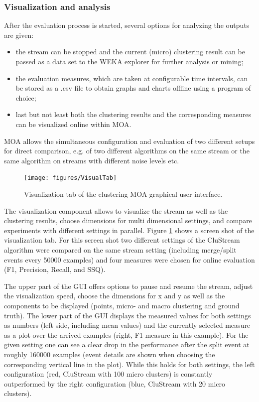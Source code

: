 \documentclass[a4paper,12pt,twoside]{book}
\begin{document}
\subsubsection{Visualization and analysis}
\label{sec:gui}

After the evaluation process is started, several options for analyzing the outputs are given:
\begin{itemize}
\item the stream can be stopped and the current (micro) clustering result can be passed as a data set to the WEKA explorer for further analysis or mining; 
\item the evaluation measures, which are taken at configurable time intervals, can be stored as a {.csv} file to obtain graphs and charts offline using a program of choice;
\item last but not least both the clustering results and the corresponding measures can be visualized online within MOA.\end{itemize}


MOA allows the simultaneous configuration and evaluation of two different setups for direct comparison, e.g. of two different algorithms 
on the same stream or the same algorithm on streams with different noise levels etc.

\begin{figure}[t]
\begin{center} 
\texttt{[image: figures/VisualTab]}
\end{center} 
\caption{Visualization tab of the clustering MOA graphical user interface.}
\label{fig:VisualTab}
\end{figure}

The visualization component allows to visualize the stream as well as the clustering results, choose dimensions for multi dimensional settings, and compare experiments with different settings in parallel. 
Figure \ref{fig:VisualTab} shows a screen shot of the visualization tab. 
For this screen shot two different settings of the CluStream algorithm were compared on the same stream setting (including merge/split events every 50000 examples) 
and four measures were chosen for online evaluation (F1, Precision, Recall, and SSQ). 

The upper part of the GUI offers options to pause and resume the stream, adjust the visualization speed, choose the dimensions for x and y as well as the components to be displayed 
(points, micro- and macro clustering and ground truth). The lower part of the GUI displays the measured values for both settings as numbers 
(left side, including mean values) and the currently selected measure as a plot over the arrived examples (right, F1 measure in this example).
 For the given setting one can see a clear drop in the performance after the split event at roughly 160000 examples 
(event details are shown when choosing the corresponding vertical line in the plot). 
While this holds for both settings, the left configuration (red, CluStream with 100 micro clusters) is constantly outperformed by the right configuration 
(blue, CluStream with 20 micro clusters). 
\end{document}
